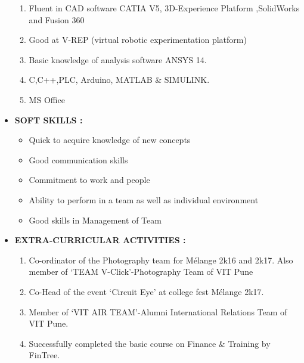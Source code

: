 \documentclass[11pt]{article}
\begin{document}
\begin{itemize}[label=$\star$]
		\begin{enumerate}
			\itemsep0em
			\item Fluent in CAD software CATIA V5, 3D-Experience Platform ,SolidWorks and Fusion 360 
			\item Good at V-REP (virtual robotic experimentation platform)
			\item Basic knowledge of analysis software ANSYS 14.
			\item C,C++,PLC, Arduino, MATLAB \& SIMULINK.
			\item MS Office
		\end{enumerate}
		\bigskip
		\item	\begin{large} \textbf{SOFT SKILLS :} \end{large}
		\begin{itemize}[label=$\bullet$]
			\item Quick to acquire knowledge of new concepts
			\item Good communication skills
			\item Commitment to work and people
			\item Ability to perform in a team as well as individual environment
			\item Good skills in Management of Team
		\end{itemize}
		\bigskip
		\item	\begin{large} \textbf{EXTRA-CURRICULAR ACTIVITIES :} \end{large}
		\begin{enumerate}
			\item Co-ordinator of the Photography team for Mélange 2k16 and 2k17. Also member of ‘TEAM V-Click’-Photography Team of VIT Pune
			\item Co-Head of the event ‘Circuit Eye’ at college fest Mélange 2k17. 
			\item Member of ‘VIT AIR TEAM’-Alumni International Relations Team of VIT Pune.
			\item Successfully completed the basic course on Finance \& Training by FinTree.
		\end{enumerate}

\end{itemize}
\end{document}
